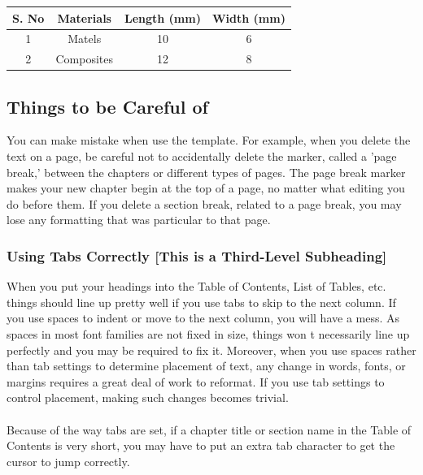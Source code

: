 \documentclass{article}
\begin{document}
\begin{justify}
\begin{table}[H]
        \setlength\tabcolsep{27pt}
        \begin{tabular}{|c|c|c|c|}
        \hline S. No & Materials & Length (mm) & Width (mm) \\
					\hline
					 1 & Matels & 10 & 6 \\
					\hline
					 2 & Composites & 12 & 8 \\
					\hline
					
					\hline
				\end{tabular}
    
			\label{table1}
		\end{table}

\subsection{Things to be Careful of}
You can make mistake when use the template. For example, when you delete the text on a page, be careful not to accidentally delete the marker, called a 'page break,' between the chapters or different types of pages. The page break marker makes your new chapter begin at the top of a page, no matter what editing you do before them. If you delete a section break, related to a page break, you may lose any formatting that was particular to that page.
\subsubsection{Using Tabs Correctly [This is a Third-Level Subheading]}
When you put your headings into the Table of Contents, List of Tables, etc. things should line up pretty well if you use tabs to skip to the next column. If you use spaces to indent or move to the next column, you will have a mess. As spaces in most font families are not fixed in size, things won t necessarily line up perfectly and you may be required to fix it.  Moreover, when you use spaces rather than tab settings to determine placement of text, any change in words, fonts, or margins requires a great deal of work to reformat.  If you use tab settings to control placement, making such changes becomes trivial. \\~\\
Because of the way tabs are set, if a chapter title or section name in the Table of Contents is very short, you may have to put an extra tab character to get the cursor to jump correctly. 

\end{justify}
\end{document}
